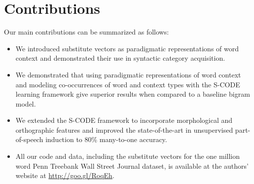\section{Contributions}
\label{sec:contrib}

Our main contributions can be summarized as follows:
\begin{itemize}
\item We introduced substitute vectors as paradigmatic representations
  of word context and demonstrated their use in syntactic category
  acquisition.
\item We demonstrated that using paradigmatic representations of word
  context and modeling co-occurrences of word and context types with
  the S-CODE learning framework give superior results when compared to
  a baseline bigram model.
\item We extended the S-CODE framework to incorporate morphological
  and orthographic features and improved the state-of-the-art in
  unsupervised part-of-speech induction to 80\% many-to-one accuracy.
\item All our code and data, including the substitute vectors for the
  one million word Penn Treebank Wall Street Journal dataset, is
  available at the authors' website at \mbox{\url{http://goo.gl/RoqEh}}.
\end{itemize}

